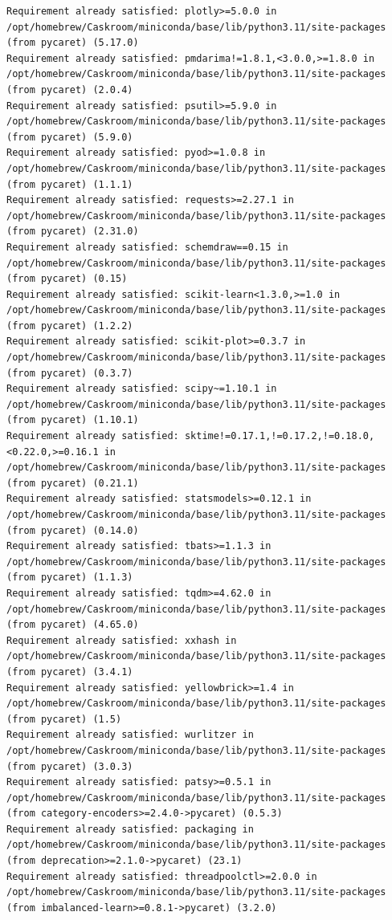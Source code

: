 \documentclass[
  letterpaper,
  DIV=11,
  numbers=noendperiod]{scrartcl}
\begin{document}
\begin{verbatim}
Requirement already satisfied: plotly>=5.0.0 in /opt/homebrew/Caskroom/miniconda/base/lib/python3.11/site-packages (from pycaret) (5.17.0)
Requirement already satisfied: pmdarima!=1.8.1,<3.0.0,>=1.8.0 in /opt/homebrew/Caskroom/miniconda/base/lib/python3.11/site-packages (from pycaret) (2.0.4)
Requirement already satisfied: psutil>=5.9.0 in /opt/homebrew/Caskroom/miniconda/base/lib/python3.11/site-packages (from pycaret) (5.9.0)
Requirement already satisfied: pyod>=1.0.8 in /opt/homebrew/Caskroom/miniconda/base/lib/python3.11/site-packages (from pycaret) (1.1.1)
Requirement already satisfied: requests>=2.27.1 in /opt/homebrew/Caskroom/miniconda/base/lib/python3.11/site-packages (from pycaret) (2.31.0)
Requirement already satisfied: schemdraw==0.15 in /opt/homebrew/Caskroom/miniconda/base/lib/python3.11/site-packages (from pycaret) (0.15)
Requirement already satisfied: scikit-learn<1.3.0,>=1.0 in /opt/homebrew/Caskroom/miniconda/base/lib/python3.11/site-packages (from pycaret) (1.2.2)
Requirement already satisfied: scikit-plot>=0.3.7 in /opt/homebrew/Caskroom/miniconda/base/lib/python3.11/site-packages (from pycaret) (0.3.7)
Requirement already satisfied: scipy~=1.10.1 in /opt/homebrew/Caskroom/miniconda/base/lib/python3.11/site-packages (from pycaret) (1.10.1)
Requirement already satisfied: sktime!=0.17.1,!=0.17.2,!=0.18.0,<0.22.0,>=0.16.1 in /opt/homebrew/Caskroom/miniconda/base/lib/python3.11/site-packages (from pycaret) (0.21.1)
Requirement already satisfied: statsmodels>=0.12.1 in /opt/homebrew/Caskroom/miniconda/base/lib/python3.11/site-packages (from pycaret) (0.14.0)
Requirement already satisfied: tbats>=1.1.3 in /opt/homebrew/Caskroom/miniconda/base/lib/python3.11/site-packages (from pycaret) (1.1.3)
Requirement already satisfied: tqdm>=4.62.0 in /opt/homebrew/Caskroom/miniconda/base/lib/python3.11/site-packages (from pycaret) (4.65.0)
Requirement already satisfied: xxhash in /opt/homebrew/Caskroom/miniconda/base/lib/python3.11/site-packages (from pycaret) (3.4.1)
Requirement already satisfied: yellowbrick>=1.4 in /opt/homebrew/Caskroom/miniconda/base/lib/python3.11/site-packages (from pycaret) (1.5)
Requirement already satisfied: wurlitzer in /opt/homebrew/Caskroom/miniconda/base/lib/python3.11/site-packages (from pycaret) (3.0.3)
Requirement already satisfied: patsy>=0.5.1 in /opt/homebrew/Caskroom/miniconda/base/lib/python3.11/site-packages (from category-encoders>=2.4.0->pycaret) (0.5.3)
Requirement already satisfied: packaging in /opt/homebrew/Caskroom/miniconda/base/lib/python3.11/site-packages (from deprecation>=2.1.0->pycaret) (23.1)
Requirement already satisfied: threadpoolctl>=2.0.0 in /opt/homebrew/Caskroom/miniconda/base/lib/python3.11/site-packages (from imbalanced-learn>=0.8.1->pycaret) (3.2.0)

\end{verbatim}
\end{document}
